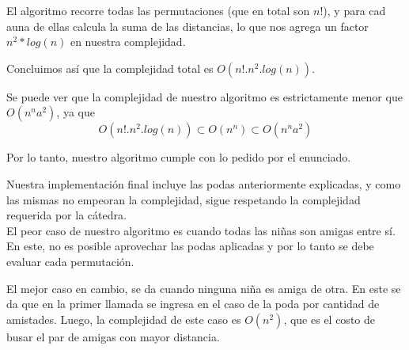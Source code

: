 
El algoritmo recorre todas las permutaciones (que en total son $n!$), y para cad auna de ellas calcula la suma de las distancias, lo que nos agrega un factor $n^2 * log(n)$  en nuestra complejidad.

Concluimos as\'i que la complejidad total es $O(n! . n^2 . log(n))$.

Se puede ver que la complejidad de nuestro algoritmo es estrictamente menor que $O(n^n a^2)$, ya que \[
O(n! . n^2 . log(n)) \subset O(n^n) \subset O(n^n a^2)
 \]
 
Por lo tanto, nuestro algoritmo cumple con lo pedido por el enunciado.

Nuestra implementaci\'on final incluye las podas anteriormente explicadas, y como las mismas no empeoran la complejidad, sigue respetando la complejidad requerida por la c\'atedra.\\

El peor caso de nuestro algoritmo es cuando todas las niñas son amigas entre s\'i. En este, no es posible aprovechar las podas aplicadas y por lo tanto se debe evaluar cada permutaci\'on.

El mejor caso en cambio, se da cuando ninguna niña es amiga de otra. En este se da que en la primer llamada se ingresa en el caso de la poda por cantidad de amistades. Luego, la complejidad de este caso es $O(n^2)$, que es el costo de busar el par de amigas con mayor distancia.
